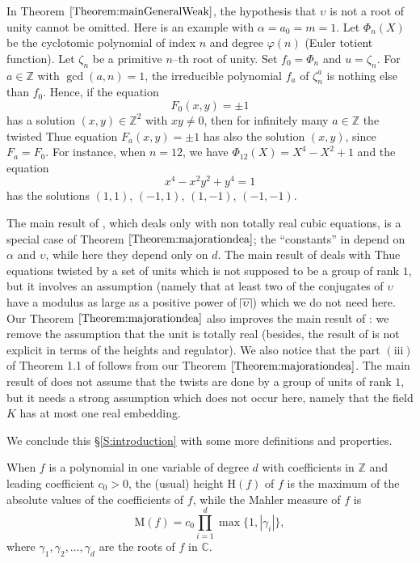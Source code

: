 \documentclass[leqno,11pt]{article}
\def\house#1{\setbox1=\hbox{$\,#1\,$}%
\dimen1=\ht1 \advance\dimen1 by 2pt \dimen2=\dp1 \advance\dimen2 by 2pt
\setbox1=\hbox{\vrule height\dimen1 depth\dimen2\box1\vrule}%
\setbox1=\vbox{\hrule\box1}%
\advance\dimen1 by .4pt \ht1=\dimen1
\advance\dimen2 by .4pt \dp1=\dimen2 \box1\relax}
\def\C{\mathbb{C}}
\def\Z{\mathbb{Z}}
\def\rmH{{\mathrm{H}}}
\def\rmM{{\mathrm{M}}}
\def\rmM{{\mathrm{M}}}
\begin{document}
In Theorem $\ref{Theorem:mainGeneralWeak}$, the hypothesis that $\upsilon$ is not a root of unity cannot be omitted. Here is an example with $\alpha=a_0=m=1$. Let $\Phi_n(X)$ be the cyclotomic polynomial of index $n$ and degree $\varphi(n)$ (Euler totient function). Let $\zeta_n$ be a primitive $n$--th root of unity. Set $f_0=\Phi_n$ and $u=\zeta_n$. 
For $a\in\Z$ with $\gcd(a,n)=1$, the irreducible polynomial $f_a$ of $\zeta_n^a$ is nothing else than $f_0$. Hence, if the equation 
$$
F_0(x,y)=\pm 1
$$
has a solution $(x,y)\in\Z^2$ with $xy\not=0$, then for infinitely many $a\in\Z$ the twisted Thue equation $F_a(x,y)=\pm 1$ has also the solution $(x,y)$, since $F_a=F_0$. For instance, when $n=12$, we have $\Phi_{12}(X)=X^4-X^2+1$ and
the equation 
$$ 
x^4-x^2y^2+y^4=1
$$
has the solutions $(1,1)$, $(-1,1)$, $(1,-1)$, $(-1,-1)$. 

The main result of \cite{LWvdP}, which deals only with non totally real cubic equations, is a special case of Theorem $\ref{Theorem:majorationdea}$; the ``constants'' in \cite{LWvdP} depend on $\alpha$ and $\upsilon$, while here they depend only on $d$. The main result of \cite{LW2} deals with Thue equations twisted by a set of units which is not supposed to be a group of rank $1$, but it involves an assumption (namely that at least two of the conjugates of $\upsilon$ have a modulus as large as a positive power of $\house{\upsilon}$) which we do not need here. Our Theorem $\ref{Theorem:majorationdea}$ also improves the main result of \cite{LW-Ram}: we remove the assumption that the unit is totally real (besides, the result of \cite{LW-Ram} is not explicit in terms of the heights and regulator). We also notice that the part ${\mathrm{(iii)}}$ of Theorem 1.1 of \cite{LW-Thue} follows from our Theorem $\ref{Theorem:majorationdea}$. The main result of \cite{LW-Balu} does not assume that the twists are done by a group of units of rank $1$, but it needs a strong assumption which does not occur here, namely that the field $K$ has at most one real embedding. 

We conclude this \S \ref{S:introduction} with some more definitions and properties.
 

When $f$ is a polynomial in one variable of degree $d$ with coefficients in $\Z$ and leading coefficient $c_0>0$, the (usual) height $\rmH(f)$ of $f$ is the maximum of the absolute values of the coefficients of $f$, while the Mahler measure of $f$ is 
$$
\rmM(f)=c_0\prod_{i=1}^d \max\{1,|\gamma_i|\},
$$
where $\gamma_1,\gamma_2,\dots,\gamma_d$ are the roots of $f$ in $\C$.
\end{document}
